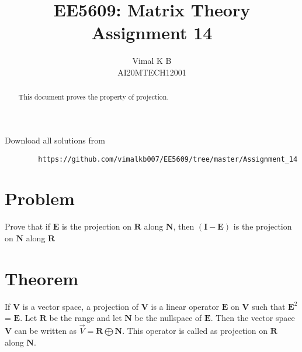 \documentclass[journal,12pt,twocolumn]{IEEEtran}
\begin{document}
	\makeatletter
	\makeatother
	\let\StandardTheFigure\thefigure
	\let\vec\mathbf
	\renewcommand{\thefigure}{\theproblem}
	\def\putbox#1#2#3{\makebox[0in][l]{\makebox[#1][l]{}\raisebox{\baselineskip}[0in][0in]{\raisebox{#2}[0in][0in]{#3}}}}
	\def\rightbox#1{\makebox[0in][r]{#1}}
	\def\centbox#1{\makebox[0in]{#1}}
	\def\topbox#1{\raisebox{-\baselineskip}[0in][0in]{#1}}
	\def\midbox#1{\raisebox{-0.5\baselineskip}[0in][0in]{#1}}
	\vspace{3cm}
	\title{EE5609: Matrix Theory\\
		Assignment 14\\}
	\author{Vimal K B\\
		AI20MTECH12001}
	\maketitle
	\newpage
	\bigskip
	\renewcommand{\thefigure}{\theenumi}
	\renewcommand{\thetable}{\theenumi}
	\begin{abstract}
		This document proves the property of projection.
	\end{abstract}
	Download all solutions from 
	\begin{lstlisting}
		https://github.com/vimalkb007/EE5609/tree/master/Assignment_14
	\end{lstlisting}
	\section{\textbf{Problem}}
	Prove that if $\mathbf{E}$ is the projection on $\mathbf{R}$ along $\mathbf{N}$, then $(\mathbf{I-E})$ is the projection on $\mathbf{N}$ along $\mathbf{R}$ 
	
	
	\section{\textbf{Theorem}}
	
	\begin{theorem}\label{thm1}
		If $\vec{V}$ is a vector space, a projection of $\vec{V}$ is a linear operator $\mathbf{E}$ on $\vec{V}$ such that $\mathbf{E}^2$ = $\mathbf{E}$. Let $\mathbf{R}$ be the range and let $\mathbf{N}$ be the nullspace of $\mathbf{E}$. Then the vector space $\vec{V}$ can be written as $\Vec{V} = \mathbf{R} \bigoplus \mathbf{N}$. This operator is called as projection on $\mathbf{R}$ along $\mathbf{N}$. 
	\end{theorem}
	
\end{document}
